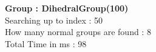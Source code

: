 \textbf{Group : DihedralGroup(100)}\\
Searching up to index : 50\\
How many normal groups are found : 8\\
Total Time in ms : 98\\
